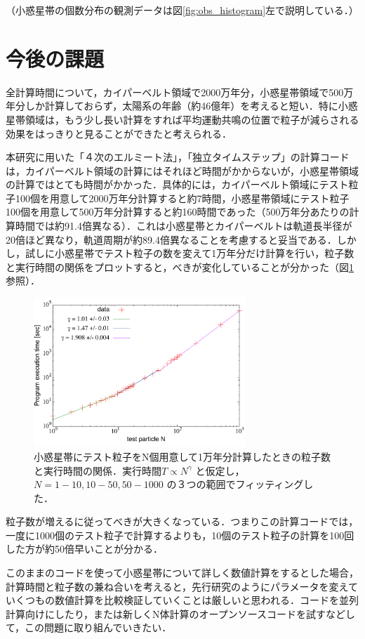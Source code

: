 \documentclass[11pt,a4paper,oneside,onecolumn]{jreport}
\begin{document}
（小惑星帯の個数分布の観測データは図\ref{fig:obs_histogram}左で説明している．）
\\


\section{今後の課題}
全計算時間について，カイパーベルト領域で2000万年分，小惑星帯領域で500万年分しか計算しておらず，太陽系の年齢（約46億年）を考えると短い．特に小惑星帯領域は，もう少し長い計算をすれば平均運動共鳴の位置で粒子が減らされる効果をはっきりと見ることができたと考えられる．

本研究に用いた「４次のエルミート法」，「独立タイムステップ」の計算コードは，カイパーベルト領域の計算にはそれほど時間がかからないが，小惑星帯領域の計算ではとても時間がかかった．具体的には，カイパーベルト領域にテスト粒子100個を用意して2000万年分計算すると約7時間，小惑星帯領域にテスト粒子100個を用意して500万年分計算すると約160時間であった（500万年分あたりの計算時間では約91.4倍異なる）．これは小惑星帯とカイパーベルトは軌道長半径が20倍ほど異なり，軌道周期が約89.4倍異なることを考慮すると妥当である．しかし，試しに小惑星帯でテスト粒子の数を変えて1万年分だけ計算を行い，粒子数と実行時間の関係をプロットすると，べきが変化していることが分かった（図\ref{fig:Nbody_test}参照）．
\begin{figure}[H]
\centering
\includegraphics[width=8cm]{./image/Nbody_test.pdf}
\caption{小惑星帯にテスト粒子をN個用意して1万年分計算したときの粒子数と実行時間の関係．実行時間$T \propto N^{\gamma}$ と仮定し，$N = 1 - 10, 10 - 50, 50 - 1000$ の３つの範囲でフィッティングした． \label{fig:Nbody_test}}
\end{figure}
粒子数が増えるに従ってべきが大きくなっている．つまりこの計算コードでは，一度に1000個のテスト粒子で計算するよりも，10個のテスト粒子の計算を100回した方が約50倍早いことが分かる．

このままのコードを使って小惑星帯について詳しく数値計算をするとした場合，計算時間と粒子数の兼ね合いを考えると，先行研究のようにパラメータを変えていくつもの数値計算を比較検証していくことは厳しいと思われる．コードを並列計算向けにしたり，または新しくN体計算のオープンソースコードを試すなどして，この問題に取り組んでいきたい．
\end{document}
